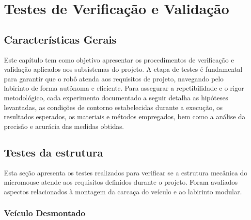 \chapter{Testes de Verificação e Validação}

\section{Características Gerais}

Este capítulo tem como objetivo apresentar os procedimentos de verificação e validação aplicados aos subsistemas do projeto. A etapa de testes é fundamental para garantir que o robô atenda aos requisitos de projeto, navegando pelo labirinto de forma autônoma e eficiente. Para assegurar a repetibilidade e o rigor metodológico, cada experimento documentado a seguir detalha as hipóteses levantadas, as condições de contorno estabelecidas durante a execução, os resultados esperados, os materiais e métodos empregados, bem como a análise da precisão e acurácia das medidas obtidas.

\section{Testes da estrutura}



Esta seção apresenta os testes realizados para verificar se a estrutura mecânica do micromouse atende aos requisitos definidos durante o projeto. Foram avaliados aspectos relacionados à montagem da carcaça do veículo e ao labirinto modular.

\subsection{Veículo Desmontado}

